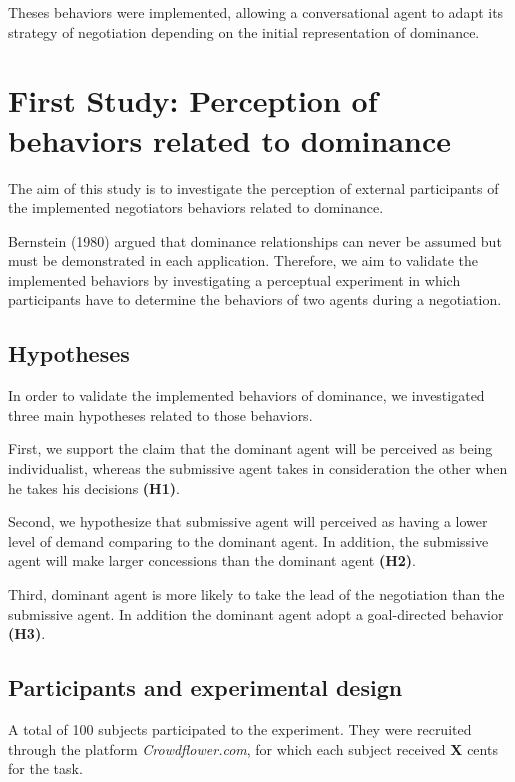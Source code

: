 \documentclass{article}
\begin{document}
			\par Theses behaviors were implemented, allowing a conversational agent to adapt its strategy of negotiation depending on the initial representation of dominance. 
			
		\section{First Study: Perception of behaviors related to dominance}
			 			
			 The aim of this study is to investigate the perception of external participants of the implemented negotiators behaviors related to dominance. 

			Bernstein (1980) argued that dominance relationships can never be assumed but must be demonstrated in each application. Therefore, we aim to validate the implemented behaviors by investigating a perceptual experiment in which participants have to determine the behaviors of two agents during a negotiation. 
			
			\subsection{Hypotheses}
			
			In order to validate the implemented behaviors of dominance, we investigated three main hypotheses related to those behaviors. 
			
			\par First, we support the claim that the dominant agent will be perceived as being individualist, whereas the submissive agent takes in consideration the other when he takes his decisions \textbf{(H1)}. 
			
			\par Second, we hypothesize that submissive agent will perceived as having a lower level of demand comparing to the dominant agent. In addition, the submissive agent will make larger concessions than the dominant agent \textbf{(H2)}.
			
			\par Third, dominant agent is more likely to take the lead of the negotiation than the submissive agent. In addition the dominant agent adopt a goal-directed behavior \textbf{(H3)}. 
			
			\subsection{Participants and experimental design}
				A total of 100 subjects participated to the experiment. They were recruited through the platform \emph{Crowdflower.com}, for which each subject received \textbf{X} cents for the task.
				
\end{document}
